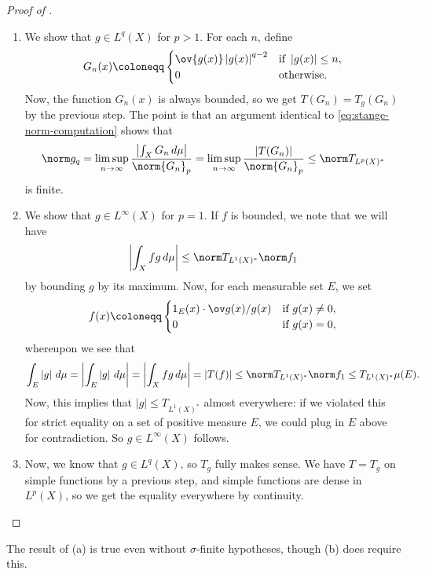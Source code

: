 \documentclass[../notes.tex]{subfiles}
\begin{document}
\begin{proof}[Proof of ]
\begin{enumerate}
		\item We show that $g\in L^q(X)$ for $p>1$. For each $n$, define
		\[G_n(x)\coloneqq\begin{cases}
			\ov{g(x)}\left|g(x)\right|^{q-2} & \text{if }\left|g(x)\right|\le n, \\
			0 & \text{otherwise}.
		\end{cases}\]
		Now, the function $G_n(x)$ is always bounded, so we get $T(G_n)=T_g(G_n)$ by the previous step. The point is that an argument identical to \eqref{eq:stange-norm-computation} shows that
		\[\norm g_q=\limsup_{n\to\infty}\frac{\left|\int_XG_n\,d\mu\right|}{\norm{G_n}_p}=\limsup_{n\to\infty}\frac{\left|T(G_n)\right|}{\norm{G_n}_p}\le\norm T_{L^p(X)^*}\]
		is finite.

		\item We show that $g\in L^\infty(X)$ for $p=1$. If $f$ is bounded, we note that we will have
		\[\left|\int_Xfg\,d\mu\right|\le\norm T_{L^1(X)^*}\norm f_1\]
		by bounding $g$ by its maximum. Now, for each measurable set $E$, we set
		\[f(x)\coloneqq\begin{cases}
			1_E(x)\cdot\ov g(x)/g(x) & \text{if }g(x)\ne0, \\
			0 & \text{if }g(x)=0,
		\end{cases}\]
		whereupon we see that
		\[\int_E\left|g\right|\,d\mu=\left|\int_E\left|g\right|\,d\mu\right|=\left|\int_Xfg\,d\mu\right|=\left|T(f)\right|\le\norm T_{L^1(X)^*}\norm f_1\le T_{L^1(X)^*}\mu(E).\]
		Now, this implies that $\left|g\right|\le T_{L^1(X)^*}$ almost everywhere: if we violated this for strict equality on a set of positive measure $E$, we could plug in $E$ above for contradiction. So $g\in L^\infty(X)$ follows.

		\item Now, we know that $g\in L^q(X)$, so $T_g$ fully makes sense. We have $T=T_g$ on simple functions by a previous step, and simple functions are dense in $L^p(X)$, so we get the equality everywhere by continuity.
		\qedhere
	\end{enumerate}
\end{proof}
\begin{remark}
	The result of (a) is true even without $\sigma$-finite hypotheses, though (b) does require this.
\end{remark}
\end{document}
